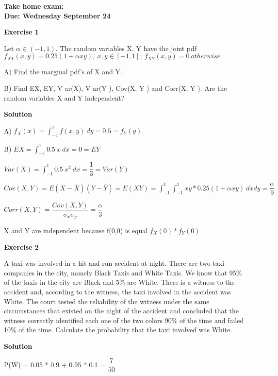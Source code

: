 \documentclass[12pt]{article}
\begin{document}


\begin{center}
\textbf{Take home exam;\\
Due: Wednesday September 24}
\end{center}

\bigskip
	
\textbf{Exercise 1}		

Let $\alpha \in (-1,1)$. The random variables X, Y have the joint pdf $f_{XY}(x,y) = 0.25(1+ \alpha xy),\ x,y \in [-1,1];\ f_{XY}(x,y)=0\ otherwise$

A) Find the marginal pdf’s of X and Y.

B) Find EX, EY, V ar(X), V ar(Y ), Cov(X, Y ) and Corr(X, Y ). Are
the random variables X and Y independent?

\medskip
		
\textbf{Solution}

A) $f_X(x)=\int^{1}_{-1}f(x,y)\ dy=0.5=f_Y(y)$

B) $EX = \int^{1}_{-1}0.5\ x\ dx = 0 = EY$

$Var(X) = \int^{1}_{-1} 0.5\ x^2\ dx = \dfrac{1}{3} = Var(Y)$

$Cov(X,Y)=E(X-\overline{X})(Y-\overline{Y})=E(XY) = \int^{1}_{-1}\int^{1}_{-1}xy*0.25(1+\alpha xy)\ dxdy = \dfrac{\alpha}{9}$

$Corr(X,Y)=\dfrac{Cov(X,Y)}{\sigma_x \sigma_y}=\dfrac{\alpha}{3}$

X and Y are independent because f(0,0) is equal $f_X(0)*f_Y(0)$

\bigskip

\textbf{Exercise 2}

A taxi was involved in a hit and run accident at night. There are two taxi companies in the city, namely Black Taxis and White Taxis. We know that 95\% of the taxis in the city are Black and 5\% are White. There is a witness to the accident and, according to the witness, the taxi involved in the accident was White. The court tested the reliability of the witness under the same circumstances that existed on the night of the accident and concluded that the witness correctly identified each one of the two colors 90\% of the time and failed 10\% of the time. Calculate the probability that the taxi involved was White.

\medskip		

\textbf{Solution}

P(W) = 0.05 * 0.9 + 0.95 * 0.1 = $\dfrac{7}{50}$
\end{document}
